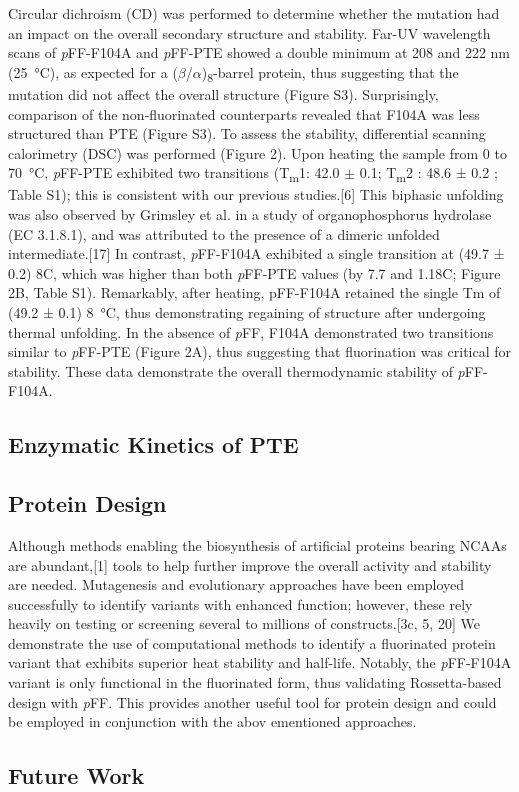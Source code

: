 \begin{refsection}
Circular dichroism (CD) was performed to determine whether the mutation had an
impact on the overall secondary structure and stability. Far-UV wavelength
scans of \emph{p}FF-F104A and \emph{p}FF-PTE showed a double minimum at 208 and
222 nm (\SI{25}{\celsius}), as expected for a
($\beta$/$\alpha$)\textsubscript{8}-barrel protein, thus suggesting that the
mutation did not affect the overall structure (Figure S3).  Surprisingly,
comparison of the non-fluorinated counterparts revealed that F104A was less
structured than PTE (Figure S3). To assess the stability, differential scanning
calorimetry (DSC) was performed (Figure 2). Upon heating the sample from 0 to
\SI{70}{\celsius}, \emph{p}FF-PTE exhibited two transitions
(T\textsubscript{m}1: 42.0 $\pm$ 0.1; T\textsubscript{m}2 : 48.6 ± 0.2 ; Table
S1); this is consistent with our previous studies.[6] This biphasic unfolding
was also observed by Grimsley et al. in a study of organophosphorus hydrolase
(EC 3.1.8.1), and was attributed to the presence of a dimeric unfolded
intermediate.[17] In contrast, \emph{p}FF-F104A exhibited a single transition
at (49.7 ± 0.2) 8C, which was higher than both \emph{p}FF-PTE values (by 7.7
and 1.18C; Figure 2B, Table S1).  Remarkably, after heating, pFF-F104A retained
the single Tm of (49.2 ± 0.1) \SI{8}{\celsius}, thus demonstrating regaining of
structure after undergoing thermal unfolding.  In the absence of \emph{p}FF,
F104A demonstrated two transitions similar to \emph{p}FF-PTE (Figure 2A), thus
suggesting that fluorination was critical for stability.  These data
demonstrate the overall thermodynamic stability of \emph{p}FF-F104A.

\subsection{Enzymatic Kinetics of PTE}

\subsection{Protein Design}

Although methods enabling the biosynthesis of artificial proteins bearing NCAAs
are abundant,[1] tools to help further improve the overall activity and
stability are needed. Mutagenesis and evolutionary approaches have been
employed successfully to identify variants with enhanced function; however,
these rely heavily on testing or screening several to millions of
constructs.[3c, 5, 20] We demonstrate the use of computational methods to
identify a fluorinated protein variant that exhibits superior heat stability
and half-life. Notably, the \emph{p}FF-F104A variant is only functional in the
fluorinated form, thus validating Rossetta-based design with \emph{p}FF. This
provides another useful tool for protein design and could be employed in
conjunction with the abov ementioned approaches.

\subsection{Future Work}

\printbibliography[heading=subbibliography]

\end{refsection}
